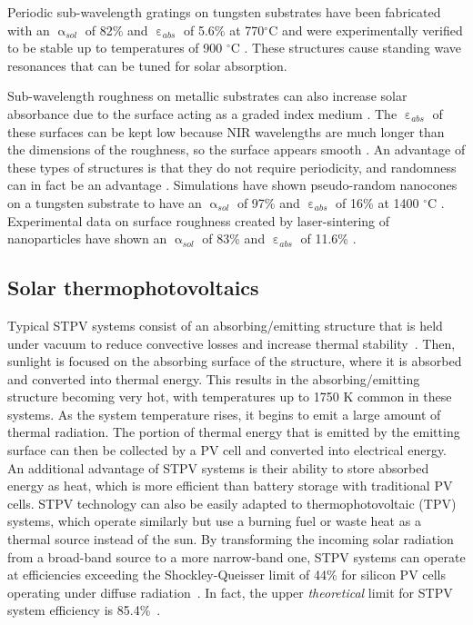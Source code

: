 \documentclass[review]{elsarticle}
\begin{document}
Periodic sub-wavelength gratings on tungsten substrates have been fabricated with an $\upalpha_{sol}$ of 82\% and $\upepsilon_{abs}$ of 5.6\% at 770$^\circ$C and were experimentally verified to be 
stable up to temperatures of 900 $^\circ$C \cite{A13}.  These structures cause standing wave resonances that can be tuned for solar absorption.

Sub-wavelength roughness on metallic substrates can also increase solar absorbance due to the surface acting as a graded index medium \cite{A13,A19}.  The $\upepsilon_{abs}$ of these surfaces can be kept low because NIR wavelengths are much longer than the dimensions of the roughness, so the surface appears smooth \cite{A14}.  An advantage of these types of structures is that they do not require periodicity, and randomness can in fact be an advantage \cite{me1}.  Simulations have shown pseudo-random nanocones on a tungsten substrate to have an $\upalpha_{sol}$ of 97\% and $\upepsilon_{abs}$ of 16\% at 1400 $^\circ$C \cite{me1}.  Experimental data on surface roughness created by laser-sintering of nanoparticles have shown an $\upalpha_{sol}$ of 83\% and $\upepsilon_{abs}$ of 11.6\% \cite{g21}.

\subsection{Solar thermophotovoltaics}
Typical STPV systems consist of an absorbing/emitting structure that is held under vacuum to reduce convective losses and increase thermal stability~\cite{global_opt, convection}.  Then, sunlight is focused on the absorbing surface of the structure, where it is absorbed and converted into thermal energy.  This results in the absorbing/emitting structure becoming very hot, with temperatures up to 1750 K common in these systems.  As the system temperature rises, it begins to emit a large amount of thermal radiation.  The portion of thermal energy that is emitted by the emitting surface can then be collected by a PV cell and converted into electrical energy.  An additional advantage of STPV systems is their ability to store absorbed energy as heat, which is more efficient than battery storage with traditional PV cells.  STPV technology can also be easily adapted to thermophotovoltaic (TPV) systems, which operate similarly but use a burning fuel or waste heat as a thermal source instead of the sun. By transforming the incoming solar radiation from a broad-band source to a more narrow-band one, STPV systems can operate at efficiencies exceeding the Shockley-Queisser limit of 44\% for silicon PV cells operating under diffuse radiation~\cite{SQ}.  In fact, the upper {\it theoretical} limit for STPV system efficiency is 85.4\%~\cite{A2}.
\end{document}
